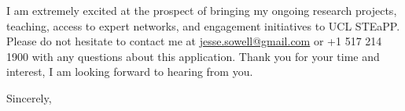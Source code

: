 \documentclass[11pt]{letter}
\begin{document}
\begin{letter}



%
I am extremely excited at the prospect of bringing my ongoing research projects, teaching, access to expert networks, and engagement initiatives to UCL STEaPP.
%
Please do not hesitate to contact me at \href{mailto:jesse.sowell@gmail.com}{jesse.sowell@gmail.com} or +1 517 214 1900 with any questions about this application.
%
Thank you for your time and interest, I am looking forward to hearing from you.

\vspace{\baselineskip}



\closing{Sincerely,}




\end{letter}
\end{document}

